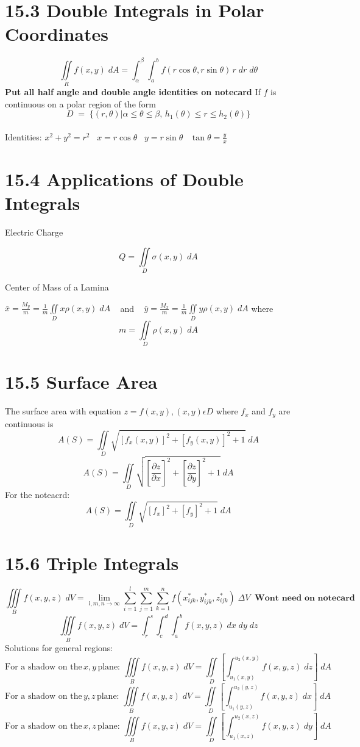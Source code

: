\documentclass{article}
\begin{document}
\section*{15.3 Double Integrals in Polar Coordinates}
$$\iint\limits_{R} f(x,y) \; dA = \int_{\alpha}^{\beta} \int_{a}^{b} f(r\cos \theta,  r\sin \theta)\, r \; dr \; d\theta$$
\textbf{Put all half angle and double angle identities on notecard}
If $f$ is continuous on a polar region of the form $$D\; = \; \{ (r,\theta )|\alpha \leq \theta \leq \beta , \, h_1(\theta) \leq r \leq h_2(\theta)\}$$
\\Identities: $x^2+y^2=r^2 \; \; \; x=r\cos\theta \; \; \; y=r\sin\theta \;\;\; \tan \theta = \frac{y}{x}$
\section*{15.4 Applications of Double Integrals}
\begin{center}
	Electric Charge
\end{center}
$$Q= \iint\limits_{D} \sigma(x,y) \; dA$$
\begin{center} {Center of Mass of a Lamina}\end{center}
$\bar{x} = \frac{M_y}{m} = \frac{1}{m} \iint\limits_D x\rho (x,y)\; dA\;\;\;$ and $\;\;\; \bar{y} = \frac{M_x}{m} = \frac{1}{m} \iint\limits_D y\rho (x,y)\; dA$
where $$m = \iint\limits_D \rho (x,y)\; dA$$
\pagebreak
\section*{15.5 Surface Area}
The surface area with equation $z=f(x,y),(x,y)\epsilon D$ where $f_x$ and $f_y$ are continuous is
$$A(S) = \iint\limits_D \sqrt{[f_x(x,y)]^2+[f_y(x,y)]^2 + 1}\; dA$$
$$A(S) = \iint\limits_D \sqrt{\left[\frac{\partial z}{\partial x}\right]^2+\left[\frac{\partial z}{\partial y	}\right]^2 + 1}\; dA$$
For the noteacrd:
$$A(S) = \iint\limits_D \sqrt{\left[f_x\right]^2+\left[f_y\right]^2 + 1}\; dA$$
\section*{15.6 Triple Integrals}
$$\iiint\limits_{B} f(x,y,z)\; dV = \lim_{l,m,n \rightarrow \infty} \displaystyle\sum_{i=1}^{l}\sum_{j=1}^{m}\sum_{k=1}^{n} f(x^*_{ijk},y^*_{ijk},z^*_{ijk}) \; \Delta V \; \; \textbf{Wont need on notecard}$$
$$\iiint\limits_{B} f(x,y,z)\; dV = \int_{r}^{s} \int_{c}^{d} \int_{a}^{b} f(x,y,z) \; dx \; dy \; dz$$
Solutions for general regions:
$$\text{For a shadow on the}\,  x,y \, \text{plane: }\iiint\limits_{B} f(x,y,z)\; dV =  \iint\limits_D \left[ \int_{u_1(x,y)}^{u_2(x,y)} f(x,y,z) \; dz \right] \; dA $$
$$\text{For a shadow on the}\,  y,z \, \text{plane: }\iiint\limits_{B} f(x,y,z)\; dV =  \iint\limits_D \left[ \int_{u_1(y,z)}^{u_2(y,z)} f(x,y,z) \; dx \right] \; dA $$
$$\text{For a shadow on the}\,  x,z \, \text{plane: }\iiint\limits_{B} f(x,y,z)\; dV =  \iint\limits_D \left[ \int_{u_1(x,z)}^{u_2(x,z)} f(x,y,z) \; dy \right] \; dA $$
\end{document}

